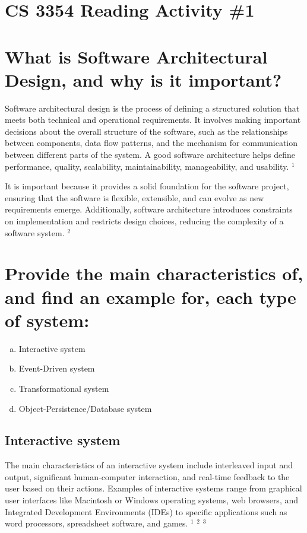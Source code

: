 
\section*{\Huge\bfseries CS 3354 Reading Activity \#1}

\section{What is Software Architectural Design, and why is it important?}
Software architectural design is the process of defining a structured solution that meets both technical and operational requirements. It involves making important decisions about the overall structure of the software, such as the relationships between components, data flow patterns, and the mechanism for communication between different parts of the system. A good software architecture helps define performance, quality, scalability, maintainability, manageability, and usability. 
\href{https://www.netsolutions.com/insights/why-software-architecture-matters-to-build-scalable-solutions/}{$^1$}

It is important because it provides a solid foundation for the software project, ensuring that the software is flexible, extensible, and can evolve as new requirements emerge. Additionally, software architecture introduces constraints on implementation and restricts design choices, reducing the complexity of a software system. 
\href{https://www.linkedin.com/pulse/8-reasons-why-software-architecture-important-ahad-khan-csm/}{$^2$}

\section{Provide the main characteristics of, and find an example for, each type of system:}
\begin{enumerate}[a.]
	\item Interactive system
	\item Event-Driven system
	\item Transformational system
	\item Object-Persistence/Database system
\end{enumerate}

\subsection{Interactive system}
The main characteristics of an interactive system include interleaved input and output, significant human-computer interaction, and real-time feedback to the user based on their actions. Examples of interactive systems range from graphical user interfaces like Macintosh or Windows operating systems, web browsers, and Integrated Development Environments (IDEs) to specific applications such as word processors, spreadsheet software, and games. 
\href{https://people.cs.pitt.edu/~chang/365/2petri/s2.htm}{$^1$}
\href{https://www.encyclopedia.com/computing/news-wires-white-papers-and-books/interactive-systems}{$^2$}
\href{https://www.geeksforgeeks.org/interactive-operating-system/}{$^3$}

